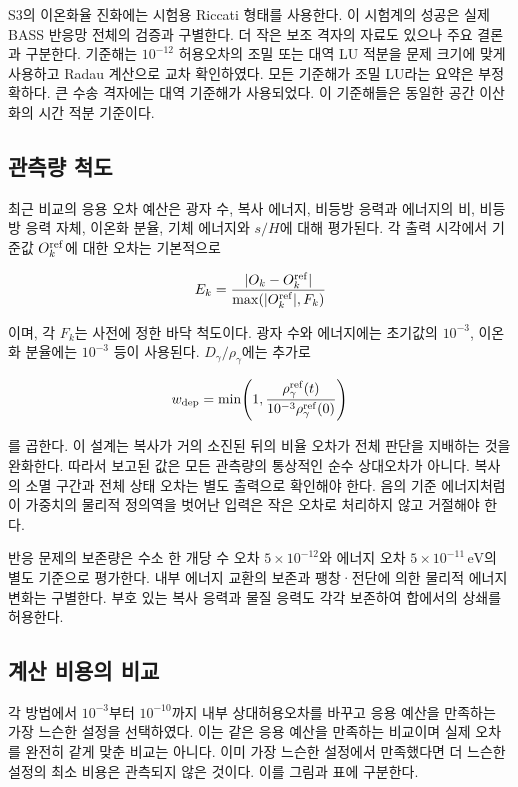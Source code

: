 \documentclass[
  10pt,
  a4paper,
]{article}
\begin{document}
S3의 이온화율 진화에는 시험용 Riccati 형태를 사용한다. 이 시험계의
성공은 실제 BASS 반응망 전체의 검증과 구별한다. 더 작은 보조 격자의
자료도 있으나 주요 결론과 구분한다. 기준해는 \(10^{-12}\) 허용오차의
조밀 또는 대역 LU 적분을 문제 크기에 맞게 사용하고 Radau 계산으로 교차
확인하였다. 모든 기준해가 조밀 LU라는 요약은 부정확하다. 큰 수송
격자에는 대역 기준해가 사용되었다. 이 기준해들은 동일한 공간 이산화의
시간 적분 기준이다.

\hypertarget{uxad00uxce21uxb7c9-uxcc99uxb3c4}{%
\subsection{관측량 척도}\label{uxad00uxce21uxb7c9-uxcc99uxb3c4}}

최근 비교의 응용 오차 예산은 광자 수, 복사 에너지, 비등방 응력과
에너지의 비, 비등방 응력 자체, 이온화 분율, 기체 에너지와 \(s/H\)에 대해
평가된다. 각 출력 시각에서 기준값 \(O_k^{\rm ref}\)에 대한 오차는
기본적으로

\[
E_k=\frac{|O_k-O_k^{\rm ref}|}{\max(|O_k^{\rm ref}|,F_k)}
\]

이며, 각 \(F_k\)는 사전에 정한 바닥 척도이다. 광자 수와 에너지에는
초기값의 \(10^{-3}\), 이온화 분율에는 \(10^{-3}\) 등이 사용된다.
\(D_\gamma/\rho_\gamma\)에는 추가로

\[
w_{\rm dep}=\min\!\left(1,\frac{\rho_\gamma^{\rm ref}(t)}{10^{-3}\rho_\gamma^{\rm ref}(0)}\right)
\]

를 곱한다. 이 설계는 복사가 거의 소진된 뒤의 비율 오차가 전체 판단을
지배하는 것을 완화한다. 따라서 보고된 값은 모든 관측량의 통상적인 순수
상대오차가 아니다. 복사의 소멸 구간과 전체 상태 오차는 별도 출력으로
확인해야 한다. 음의 기준 에너지처럼 이 가중치의 물리적 정의역을 벗어난
입력은 작은 오차로 처리하지 않고 거절해야 한다.

반응 문제의 보존량은 수소 한 개당 수 오차 \(5\times10^{-12}\)와 에너지
오차 \(5\times10^{-11}\,\mathrm{eV}\)의 별도 기준으로 평가한다. 내부
에너지 교환의 보존과 팽창·전단에 의한 물리적 에너지 변화는 구별한다.
부호 있는 복사 응력과 물질 응력도 각각 보존하여 합에서의 상쇄를
허용한다.

\hypertarget{uxacc4uxc0b0-uxbe44uxc6a9uxc758-uxbe44uxad50}{%
\subsection{계산 비용의
비교}\label{uxacc4uxc0b0-uxbe44uxc6a9uxc758-uxbe44uxad50}}

각 방법에서 \(10^{-3}\)부터 \(10^{-10}\)까지 내부 상대허용오차를 바꾸고
응용 예산을 만족하는 가장 느슨한 설정을 선택하였다. 이는 같은 응용
예산을 만족하는 비교이며 실제 오차를 완전히 같게 맞춘 비교는 아니다.
이미 가장 느슨한 설정에서 만족했다면 더 느슨한 설정의 최소 비용은
관측되지 않은 것이다. 이를 그림과 표에 구분한다.
\end{document}
